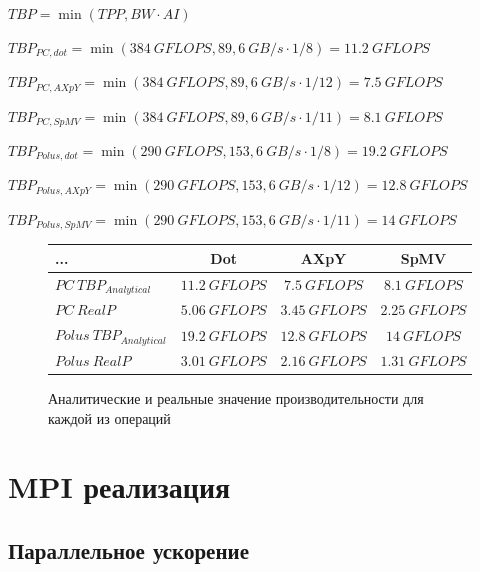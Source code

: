 \documentclass[12pt, a4paper]{article}
\begin{document}
$ TBP = \min(TPP, BW \cdot AI)  $

$ TBP_{PC, dot} = \min(384\ GFLOPS, 89,6\ GB/s \cdot 1/8) = 11.2\ GFLOPS $

$ TBP_{PC, AXpY} = \min(384\ GFLOPS, 89,6\ GB/s \cdot 1/12) = 7.5\ GFLOPS $

$ TBP_{PC, SpMV} = \min(384\ GFLOPS, 89,6\ GB/s \cdot 1/11) = 8.1\ GFLOPS $

$ TBP_{Polus, dot} = \min(290\ GFLOPS, 153,6\ GB/s \cdot 1/8) = 19.2\ GFLOPS $

$ TBP_{Polus, AXpY} = \min(290\ GFLOPS, 153,6\ GB/s \cdot 1/12) = 12.8\ GFLOPS $

$ TBP_{Polus, SpMV} = \min(290\ GFLOPS, 153,6\ GB/s \cdot 1/11) = 14\ GFLOPS $

\begin{figure}[h!]
	\center
	\setlength{\tabcolsep}{10pt}
	\renewcommand{\arraystretch}{1.5}
	\begin{tabular}{|l|c|c|c|}
		\hline
		... & Dot & AXpY & SpMV \\
		\hline
		$PC\ TBP_{Analytical} $ & $ 11.2\ GFLOPS $ & $ 7.5\ GFLOPS $ & $ 8.1\ GFLOPS $ \\
		\hline
		$PC\ RealP $ & $ 5.06\ GFLOPS $ & $ 3.45\ GFLOPS $ & $ 2.25\ GFLOPS $ \\
		\hline
		$ Polus\ TBP_{Analytical} $& $ 19.2\ GFLOPS $ & $ 12.8\ GFLOPS $ & $ 14\ GFLOPS $ \\
		\hline
		$ Polus\ RealP $ & $ 3.01\ GFLOPS $ & $ 2.16\ GFLOPS $ & $ 1.31\ GFLOPS $ \\
		\hline
	\end{tabular}
	\caption{Аналитические и реальные значение производительности для каждой из операций}
	\label{fig:tbps}
\end{figure}

\section{MPI реализация}

\subsection{Параллельное ускорение}
\end{document}
